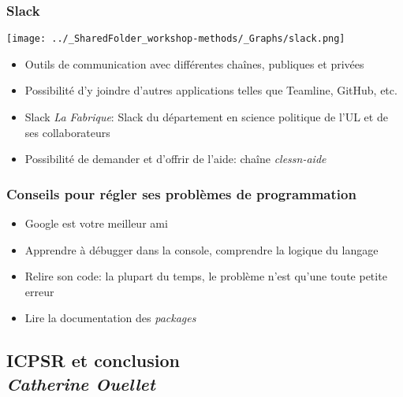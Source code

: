 \documentclass{beamer}
\begin{document}
\begin{frame}

  \frametitle{Slack} \vspace{1cm}
  
    \begin{center}
      
    \texttt{[image: ../\_SharedFolder\_workshop-methods/\_Graphs/slack.png]}

     \end{center}
      
    \begin{itemize}
     \item Outils de communication avec différentes chaînes, publiques et privées
     \item Possibilité d'y joindre d'autres applications telles que Teamline, GitHub, etc.
     \item Slack \textit{La Fabrique}: Slack du département en science politique de l'UL et de ses collaborateurs
     \item Possibilité de demander et d'offrir de l'aide: chaîne \textit{clessn-aide}
    
        
    \end{itemize}
      
\end{frame}


\begin{frame}

  \frametitle{Conseils pour régler ses problèmes de programmation} \vspace{1cm}

    \begin{itemize}
    
     \item Google est votre meilleur ami
     \item Apprendre à débugger dans la console, comprendre la logique du langage
     \item Relire son code: la plupart du temps, le problème n'est qu'une toute petite erreur
     \item Lire la documentation des \emph{packages}
    
    \end{itemize} 
    
  \end{frame}  
  
  
\subsection{ICPSR et conclusion \\ \small\emph{Catherine Ouellet}}
\end{document}
